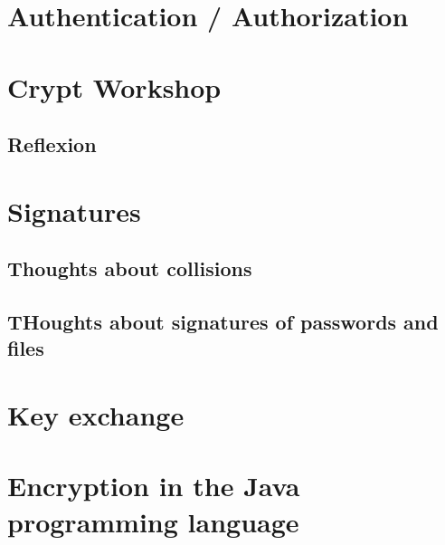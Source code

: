 \documentclass[11pt,twoside,a4paper]{article}
\begin{document}
		\section{Authentication / Authorization}
		\section{Crypt Workshop}
		\subsection{Reflexion}
		\section{Signatures}
		\subsection{Thoughts about collisions}
		\subsection{THoughts about signatures of passwords and files}
		\section{Key exchange}
		\section{Encryption in the Java programming language}
\end{document}
